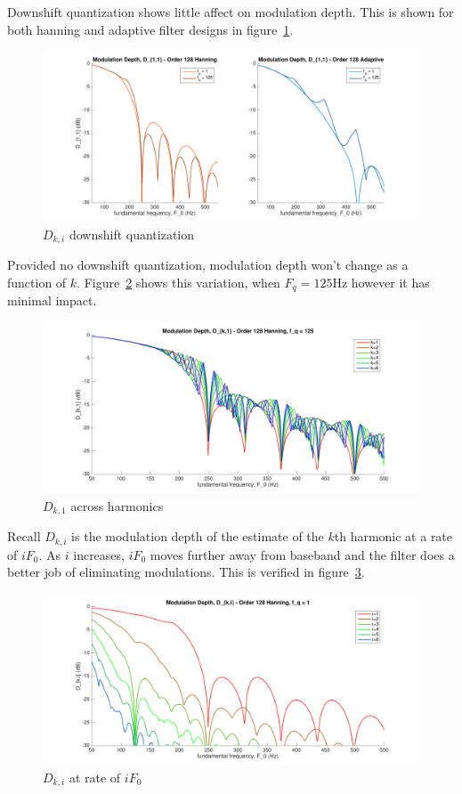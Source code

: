 \documentclass [11pt, proquest,oneside] {ganter_thesis}[2015/03/03]
\begin{document}
Downshift quantization shows little affect on modulation depth.  This is shown for both hanning and adaptive filter designs in figure~\ref{fig:d_ki_2}.

\begin{figure}[!ht]
  \centering
    \includegraphics[width=1\textwidth]{d_ki_2}
    \caption{$D_{k,i}$ downshift quantization}\label{fig:d_ki_2}
\end{figure}

Provided no downshift quantization, modulation depth won't change as a function of $k$.  Figure~\ref{fig:d_ki_4} shows this variation, when $F_q = 125$Hz however it has minimal impact.

\begin{figure}[!ht]
  \centering
    \includegraphics[width=1\textwidth]{d_ki_4}
    \caption{$D_{k,1}$ across harmonics}\label{fig:d_ki_4}
\end{figure}

Recall $D_{k,i}$ is the modulation depth of the estimate of the $k$th harmonic at a rate of $iF_0$.  As $i$ increases, $iF_0$ moves further away from baseband and the filter does a better job of eliminating modulations.  This is verified in figure~\ref{fig:d_ki_3}.

\begin{figure}[!ht]
  \centering
    \includegraphics[width=1\textwidth]{d_ki_3}
    \caption{$D_{k,i}$ at rate of $iF_0$}\label{fig:d_ki_3}
\end{figure}
\end{document}
